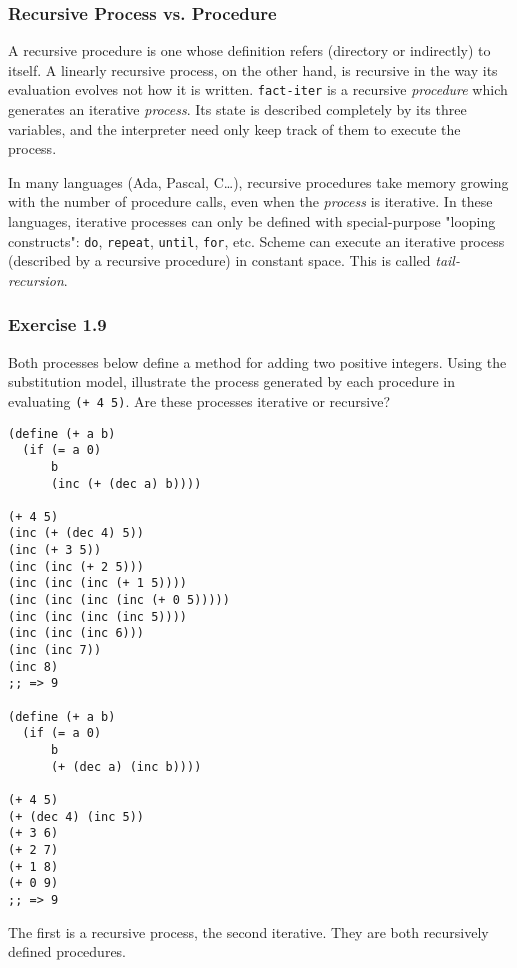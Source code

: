 \documentclass[11pt]{article}
\begin{document}
\subsubsection{Recursive Process vs. Procedure}
\label{sec-2-2-1}
A recursive procedure is one whose definition refers (directory or indirectly) to itself. A linearly recursive process, on the other hand, is recursive in the way its evaluation evolves not how it is written. \texttt{fact-iter} is a recursive \emph{procedure} which generates an iterative \emph{process}. Its state is described completely by its three variables, and the interpreter need only keep track of them to execute the process.

In many languages (Ada, Pascal, C\ldots{}), recursive procedures take memory growing with the number of procedure calls, even when the \emph{process} is iterative. In these languages, iterative processes can only be defined with special-purpose "looping constructs": \texttt{do}, \texttt{repeat}, \texttt{until}, \texttt{for}, etc. Scheme can execute an iterative process (described by a recursive procedure) in constant space. This is called \emph{tail-recursion}.

\subsubsection{Exercise 1.9}
\label{sec-2-2-2}
Both processes below define a method for adding two positive integers. Using the substitution model, illustrate the process generated by each procedure in evaluating \texttt{(+ 4 5)}. Are these processes iterative or recursive?

\begin{verbatim}
(define (+ a b)
  (if (= a 0)
      b
      (inc (+ (dec a) b))))

(+ 4 5)
(inc (+ (dec 4) 5))
(inc (+ 3 5))
(inc (inc (+ 2 5)))
(inc (inc (inc (+ 1 5))))
(inc (inc (inc (inc (+ 0 5)))))
(inc (inc (inc (inc 5))))
(inc (inc (inc 6)))
(inc (inc 7))
(inc 8)
;; => 9

(define (+ a b)
  (if (= a 0)
      b
      (+ (dec a) (inc b))))

(+ 4 5)
(+ (dec 4) (inc 5))
(+ 3 6)
(+ 2 7)
(+ 1 8)
(+ 0 9)
;; => 9
\end{verbatim}

The first is a recursive process, the second iterative. They are both recursively defined procedures.
\end{document}
